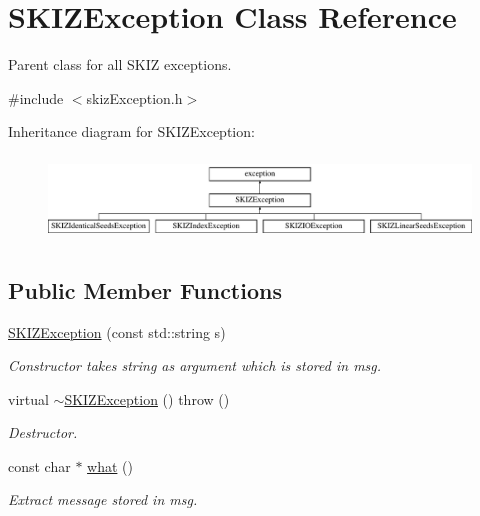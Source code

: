 \hypertarget{classSKIZException}{}\section{S\+K\+I\+Z\+Exception Class Reference}
\label{classSKIZException}


Parent class for all S\+K\+IZ exceptions.  




{\ttfamily \#include $<$skiz\+Exception.\+h$>$}

Inheritance diagram for S\+K\+I\+Z\+Exception\+:\begin{figure}[H]
\begin{center}
\leavevmode
\includegraphics[height=2.270270cm]{classSKIZException}
\end{center}
\end{figure}
\subsection*{Public Member Functions}
\begin{DoxyCompactItemize}
\item 
\mbox{\hyperlink{classSKIZException_a30a47c59e9fd4ea93441c9029c4068d9}{S\+K\+I\+Z\+Exception}} (const std\+::string s)
\begin{DoxyCompactList}\small\item\em Constructor takes string as argument which is stored in msg. \end{DoxyCompactList}\item 
virtual \mbox{\hyperlink{classSKIZException_ac1b8f1ba8ae87ce018c645a1a67b6d34}{$\sim$\+S\+K\+I\+Z\+Exception}} ()  throw ()
\begin{DoxyCompactList}\small\item\em Destructor. \end{DoxyCompactList}\item 
const char $\ast$ \mbox{\hyperlink{classSKIZException_a55c36f650f02f283215679ad070dd54b}{what}} ()
\begin{DoxyCompactList}\small\item\em Extract message stored in msg. \end{DoxyCompactList}\end{DoxyCompactItemize}


